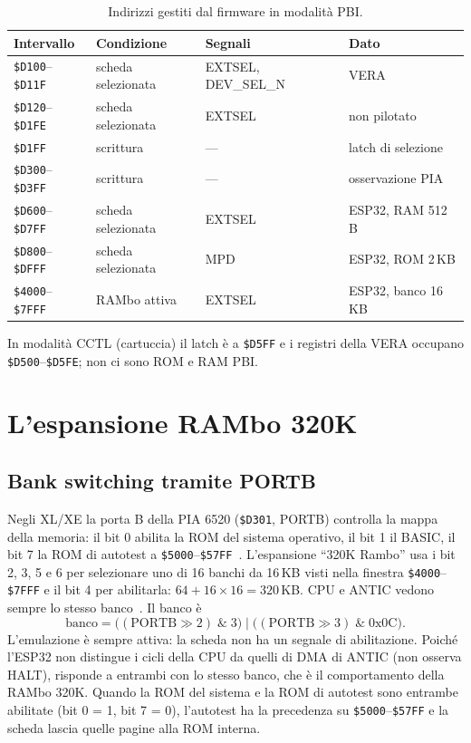 \documentclass[11pt,a4paper,twoside,openright]{report}
\newcommand{\sig}[1]{\textsf{#1}}
\newcommand{\hex}[1]{\texttt{\$#1}}
\begin{document}
\begin{table}[htbp]
  \centering
  \caption{Indirizzi gestiti dal firmware in modalità PBI.}
  \label{tab:mappa}
  \begin{tabular}{llll}
    \toprule
    \textbf{Intervallo} & \textbf{Condizione} & \textbf{Segnali} & \textbf{Dato} \\
    \midrule
    \hex{D100}--\hex{D11F} & scheda selezionata & \sig{EXTSEL}, \sig{DEV\_SEL\_N} & VERA \\
    \hex{D120}--\hex{D1FE} & scheda selezionata & \sig{EXTSEL}             & non pilotato \\
    \hex{D1FF}             & scrittura          & ---                      & latch di selezione \\
    \hex{D300}--\hex{D3FF} & scrittura          & ---                      & osservazione PIA \\
    \hex{D600}--\hex{D7FF} & scheda selezionata & \sig{EXTSEL}             & ESP32, RAM 512\,B \\
    \hex{D800}--\hex{DFFF} & scheda selezionata & \sig{MPD}                & ESP32, ROM 2\,KB \\
    \hex{4000}--\hex{7FFF} & RAMbo attiva       & \sig{EXTSEL}             & ESP32, banco 16\,KB \\
    \bottomrule
  \end{tabular}
\end{table}

In modalità CCTL (cartuccia) il latch è a \hex{D5FF} e i registri della VERA occupano
\hex{D500}--\hex{D5FE}; non ci sono ROM e RAM PBI.

\section{L'espansione RAMbo 320K}

\subsection{Bank switching tramite PORTB}

Negli XL/XE la porta B della PIA 6520 (\hex{D301}, PORTB) controlla la mappa della memoria:
il bit 0 abilita la ROM del sistema operativo, il bit 1 il BASIC, il bit 7 la ROM di
autotest a \hex{5000}--\hex{57FF}~\cite[§3.4]{ahrm}. L'espansione \enquote{320K Rambo}
usa i bit 2, 3, 5 e 6 per selezionare uno di 16 banchi da 16\,KB visti nella finestra
\hex{4000}--\hex{7FFF} e il bit 4 per abilitarla: $64 + 16 \times 16 = 320$\,KB. CPU e
ANTIC vedono sempre lo stesso banco~\cite[§3.5, §11]{ahrm}. Il banco è
\begin{equation}
  \text{banco} = \big((\text{PORTB} \gg 2) \;\&\; 3\big) \;|\; \big((\text{PORTB} \gg 3) \;\&\; \text{0x0C}\big).
\end{equation}
L'emulazione è sempre attiva: la scheda non ha un segnale di abilitazione. Poiché l'ESP32
non distingue i cicli della CPU da quelli di DMA di ANTIC (non osserva \sig{HALT}), risponde
a entrambi con lo stesso banco, che è il comportamento della RAMbo 320K. Quando la ROM del
sistema e la ROM di autotest sono entrambe abilitate (bit 0 = 1, bit 7 = 0), l'autotest ha
la precedenza su \hex{5000}--\hex{57FF} e la scheda lascia quelle pagine alla ROM interna.
\end{document}
